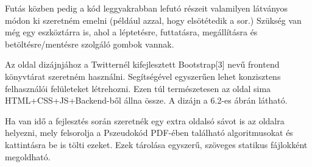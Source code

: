 Futás közben pedig a kód leggyakrabban lefutó részeit valamilyen látványos módon ki szeretném emelni (például azzal, hogy elsötétedik a sor.) Szükség van még egy eszköztárra is, ahol a léptetésre, futtatásra, megállításra és betöltésre/mentésre szolgáló gombok vannak.

Az oldal dizájnjához a Twitternél kifejlesztett Bootstrap[3] nevű frontend könyvtárat szeretném használni. Segítségével egyszerűen lehet konzisztens felhasználói felületeket létrehozni. Ezen túl természetesen az oldal sima HTML+CSS+JS+Backend-ből állna össze. A dizájn a 6.2-es ábrán látható.

Ha van idő a fejlesztés során szeretnék egy extra oldalsó sávot is az oldalra helyezni, mely felsorolja a Pszeudokód PDF-ében található algoritmusokat és kattintásra be is tölti ezeket. Ezek tárolása egyszerű, szöveges statikus fájlokként megoldható.